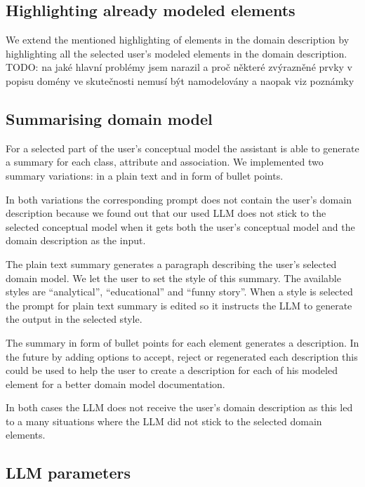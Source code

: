 \subsection{Highlighting already modeled elements}

We extend the mentioned highlighting of elements in the domain description by highlighting all the selected user's modeled elements in the domain description. \\

TODO: na jaké hlavní problémy jsem narazil a proč některé zvýrazněné prvky v popisu domény ve skutečnosti nemusí být namodelovány a naopak viz poznámky \\


\subsection{Summarising domain model}

For a selected part of the user's conceptual model the assistant is able to generate a summary for each class, attribute and association. We implemented two summary variations: in a plain text and in form of bullet points.

In both variations the corresponding prompt does not contain the user's domain description because we found out that our used LLM does not stick to the selected conceptual model when it gets both the user's conceptual model and the domain description as the input.

The plain text summary generates a paragraph describing the user's selected domain model. We let the user to set the style of this summary. The available styles are ``analytical'', ``educational'' and ``funny story''. When a style is selected the prompt for plain text summary is edited so it instructs the LLM to generate the output in the selected style.

The summary in form of bullet points for each element generates a description. In the future by adding options to accept, reject or regenerated each description this could be used to help the user to create a description for each of his modeled element for a better domain model documentation.

In both cases the LLM does not receive the user's domain description as this led to a many situations where the LLM did not stick to the selected domain elements.


\subsection{LLM parameters}

